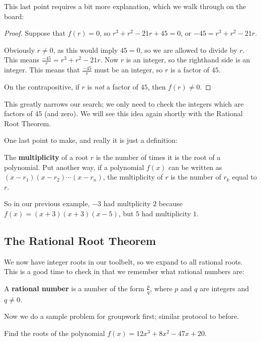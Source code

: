 This last point requires a bit more explanation, which we walk through on the board:
\begin{proof}
    Suppose that $f(r) = 0$, so $r^3+r^2-21r+45 = 0$, or $-45 = r^3+r^2-21r$. 
    
    Obviously $r \neq 0$, as this would imply $45 = 0$, so we are allowed to divide by $r$. This means $\frac{-45}{r} = r^3+r^2-21r$. Now $r$ is an integer, so the righthand side is an integer. This means that $\frac{-45}{r}$ must be an integer, so $r$ is a factor of $45$.

    On the contrapositive, if $r$ is \emph{not} a factor of $45$, then $f(r) \neq 0$.
\end{proof}

This greatly narrows our search; we only need to check the integers which are factors of $45$ (and zero). We will see this idea again shortly with the Rational Root Theorem.

One last point to make, and really it is just a definition:

\begin{definition}
    The \textbf{multiplicity} of a root $r$ is the number of times it is the root of a polynomial. Put another way, if a polynomial $f(x)$ can be written as $(x-r_1)(x-r_2)\cdots (x-r_n)$, the multiplicity of $r$ is the number of $r_k$ equal to $r$.
\end{definition}

So in our previous example, $-3$ had multplicity $2$ because $f(x) = (x+3)(x+3)(x-5)$, but $5$ had multiplicity $1$.



\subsection{The Rational Root Theorem}

We now have integer roots in our toolbelt, so we expand to all rational roots. This is a good time to check in that we remember what rational numbers are:

\begin{definition}
    A \textbf{rational number} is a number of the form $\frac{p}{q}$, where $p$ and $q$ are integers and $q\neq 0$.
\end{definition}

Now we do a sample problem for groupwork first; similar protocol to before.

\begin{example}
    Find the roots of the polynomial $f(x) = 12x^3+8x^2-47x+20$.
\end{example}

